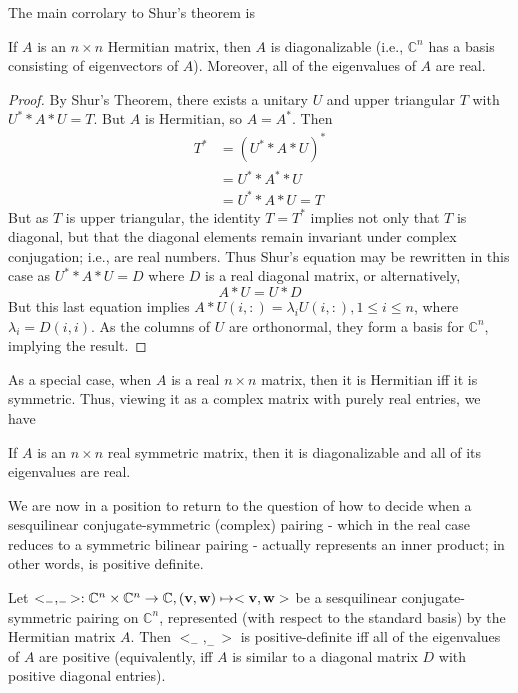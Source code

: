 \documentclass{ximera}
\begin{document}
The main corrolary to Shur's theorem is 

\begin{corollary} If $A$ is an $n\times n$ Hermitian matrix, then $A$ is diagonalizable (i.e., $\mathbb C^n$ has a basis consisting of eigenvectors of $A$). Moreover, all of the eigenvalues of $A$ are real.
\end{corollary}

\begin{proof} By Shur's Theorem, there exists a unitary $U$ and upper triangular $T$ with $U^**A*U = T$. But $A$ is Hermitian, so $A = A^*$. Then
\begin{align*}
T^* &= \left(U^**A*U\right)^*\\
        &= U^**A^**U\\
        &= U^**A*U = T
\end{align*}
But as $T$ is upper triangular, the identity $T = T^*$ implies not only that $T$ is diagonal, but that the diagonal elements remain invariant under complex conjugation; i.e., are real numbers. Thus Shur's equation may be rewritten in this case as $U^**A*U = D$ where $D$ is a real diagonal matrix, or alternatively,
\[
A*U = U*D
\]
But this last equation implies $A*U(i,:) = \lambda_i U(i,:), 1\le i\le n$, where $\lambda_i = D(i,i)$. As the columns of $U$ are orthonormal, they form a basis for $\mathbb C^n$, implying the result.
\end{proof}

As a special case, when $A$ is a real $n\times n$ matrix, then it is Hermitian iff it is symmetric. Thus, viewing it as a complex matrix with purely real entries, we have

\begin{corollary} If $A$ is an $n\times n$ real symmetric matrix, then it is diagonalizable and all of its eigenvalues are real.
\end{corollary}

We are now in a position to return to the question of how to decide when a sesquilinear conjugate-symmetric (complex) pairing - which in the real case reduces to a symmetric bilinear pairing - actually represents an inner product; in other words, is positive definite.

\begin{theorem} Let $<_-,_->:\mathbb C^n\times\mathbb C^n\to \mathbb C, ({\bf v}, {\bf w})\mapsto <{\bf v}, {\bf w}>$ be a sesquilinear conjugate-symmetric pairing on $\mathbb C^n$, represented (with respect to the standard basis) by the Hermitian matrix $A$. Then $<_-,_->$ is positive-definite iff all of the eigenvalues of $A$ are positive (equivalently, iff $A$ is similar to a diagonal matrix $D$ with positive diagonal entries).
\end{theorem}
\end{document}
